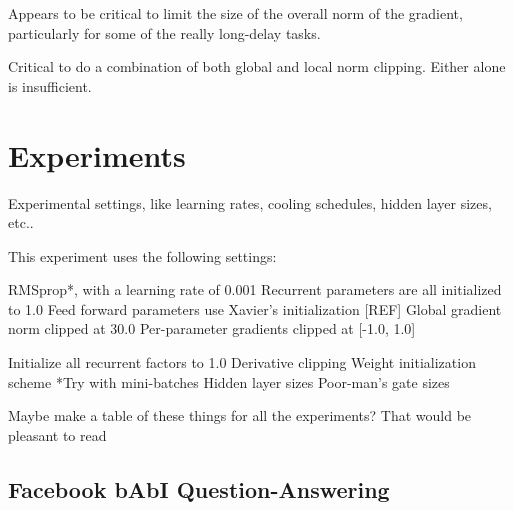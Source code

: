 \documentclass{article}
\begin{document}
Appears to be critical to limit the size of the overall norm of the gradient, particularly for some of the really long-delay tasks.

Critical to do a combination of both global and local norm clipping. Either alone is insufficient.

\section{Experiments}
\label{others}
Experimental settings, like learning rates, cooling schedules, hidden layer sizes, etc..


This experiment uses the following settings:

RMSprop*, with a learning rate of 0.001
Recurrent parameters are all initialized to 1.0
Feed forward parameters use Xavier’s initialization [REF]
Global gradient norm clipped at 30.0
Per-parameter gradients clipped at [-1.0, 1.0]

Initialize all recurrent factors to 1.0
Derivative clipping
Weight initialization scheme
*Try with mini-batches
Hidden layer sizes
Poor-man’s gate sizes

Maybe make a table of these things for all the experiments? That would be pleasant to read

\subsection{Facebook bAbI Question-Answering}
\end{document}
